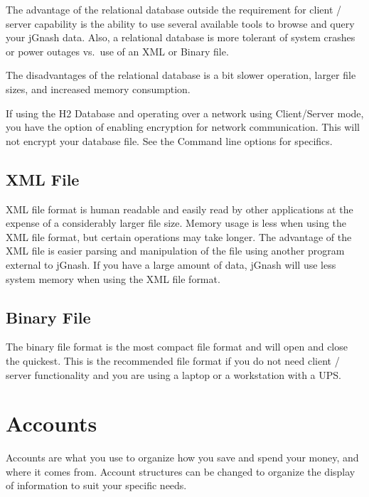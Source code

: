 \documentclass[letterpaper,12pt]{book}
\begin{document}
    The advantage of the relational database outside the requirement for client / server capability is the ability
    to use several available tools to browse
    and query your jGnash data.
    Also, a relational database is more tolerant of system crashes or power outages vs.\ use of an XML or Binary file.

    The disadvantages of the relational database is a bit slower operation, larger file sizes, and increased memory consumption.

    If using the H2 Database and operating over a network using Client/Server mode, you have the option of enabling
    encryption for network communication.
    This will not encrypt your database file.
    See the Command line options for specifics.


    \subsection{XML File}\label{subsec:xml-file}
    XML file format is human readable and easily read by other applications at the expense of a considerably larger file size.
    Memory usage is less when using the XML file format, but certain operations may take longer.
    The advantage of the XML file is easier parsing and manipulation of the file using another program external to jGnash.
    If you have a large amount of data, jGnash will use less system memory when using the XML file format.



    \subsection{Binary File}\label{subsec:binary-file}
    The binary file format is the most compact file format and will open and close the quickest.
    This is the recommended file format if you do not need client / server functionality and you are using a laptop
    or a workstation with a UPS\@.

    \newpage
    \section{Accounts}\label{sec:accounts}
    Accounts are what you use to organize how you save and spend your money, and where it comes from.
    Account structures can be changed to organize the display of information to suit your specific needs.
\end{document}
